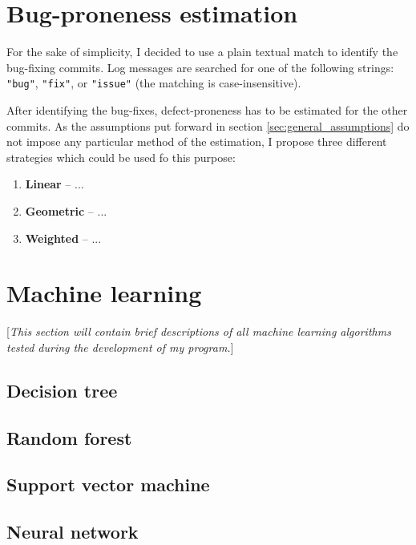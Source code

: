 \documentclass{pracamgr}
\begin{document}

\section{Bug-proneness estimation}
\label{sec:bug-proneness}
For the sake of simplicity, I decided to use a plain textual match to identify the bug-fixing commits. Log messages are searched for one of the following strings: \texttt{"bug"}, \texttt{"fix"}, or \texttt{"issue"} (the matching is case-insensitive).

After identifying the bug-fixes, defect-proneness has to be estimated for the other commits. As the assumptions put forward in section \ref{sec:general_assumptions} do not impose any particular method of the estimation, I propose three different strategies which could be used fo this purpose:
\begin{enumerate}[label=(S\arabic*)]
	\item \textbf{Linear} -- ...
	\item \textbf{Geometric} -- ...
	\item \textbf{Weighted} -- ...
\end{enumerate}

\section{Machine learning}
\label{sec:machine_learning}
[\textit{This section will contain brief descriptions of all machine learning algorithms tested during the development of my program.}]

\subsection{Decision tree}
\label{sec:decision_tree}

\subsection{Random forest}
\label{sec:random_forest}

\subsection{Support vector machine}
\label{sec:svm}

\subsection{Neural network}
\label{sec:neural_net}
\end{document}

